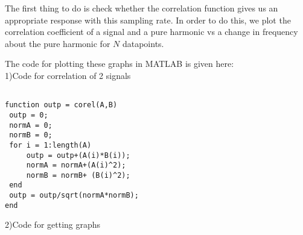 The first thing to do is check whether the correlation function gives us an appropriate response with this sampling rate. In order to do this, we plot the correlation coefficient of a signal and a pure harmonic vs a change in frequency about the pure harmonic for \(N\) datapoints. 

The code for plotting these graphs in MATLAB is given here: \\
1)Code for correlation of 2 signals
\begin{lstlisting}
    
function outp = corel(A,B)
 outp = 0;
 normA = 0;
 normB = 0;
 for i = 1:length(A)
     outp = outp+(A(i)*B(i));
     normA = normA+(A(i)^2);
     normB = normB+ (B(i)^2);
 end
 outp = outp/sqrt(normA*normB);
end
\end{lstlisting} 

2)Code for getting graphs
\begin{lstlisting}
    
\end{lstlisting}



